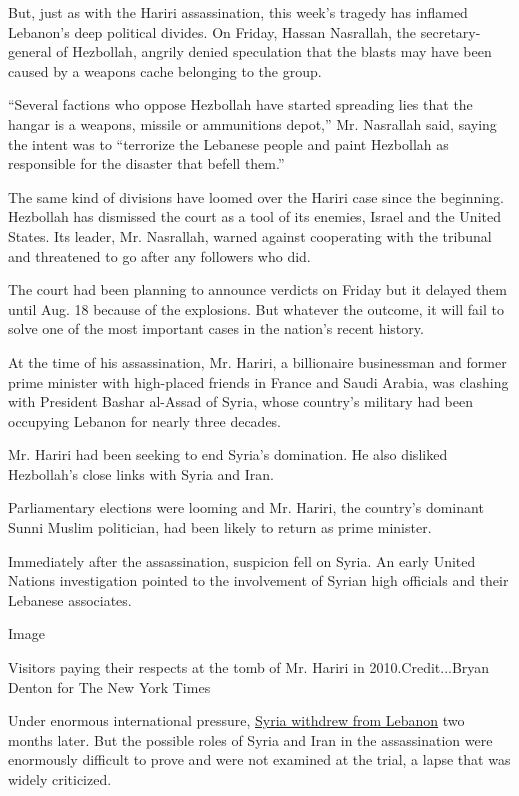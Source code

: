 But, just as with the Hariri assassination, this week's tragedy has
inflamed Lebanon's deep political divides. On Friday, Hassan Nasrallah,
the secretary-general of Hezbollah, angrily denied speculation that the
blasts may have been caused by a weapons cache belonging to the group.

``Several factions who oppose Hezbollah have started spreading lies that
the hangar is a weapons, missile or ammunitions depot,'' Mr. Nasrallah
said, saying the intent was to ``terrorize the Lebanese people and paint
Hezbollah as responsible for the disaster that befell them.''

The same kind of divisions have loomed over the Hariri case since the
beginning. Hezbollah has dismissed the court as a tool of its enemies,
Israel and the United States. Its leader, Mr. Nasrallah, warned against
cooperating with the tribunal and threatened to go after any followers
who did.

The court had been planning to announce verdicts on Friday but it
delayed them until Aug. 18 because of the explosions. But whatever the
outcome, it will fail to solve one of the most important cases in the
nation's recent history.

At the time of his assassination, Mr. Hariri, a billionaire businessman
and former prime minister with high-placed friends in France and Saudi
Arabia, was clashing with President Bashar al-Assad of Syria, whose
country's military had been occupying Lebanon for nearly three decades.

Mr. Hariri had been seeking to end Syria's domination. He also disliked
Hezbollah's close links with Syria and Iran.

Parliamentary elections were looming and Mr. Hariri, the country's
dominant Sunni Muslim politician, had been likely to return as prime
minister.

Immediately after the assassination, suspicion fell on Syria. An early
United Nations investigation pointed to the involvement of Syrian high
officials and their Lebanese associates.

Image

Visitors paying their respects at the tomb of Mr. Hariri in
2010.Credit...Bryan Denton for The New York Times

Under enormous international pressure,
\href{https://www.nytimes.com/2005/04/25/world/africa/syria-troops-end-29-years-of-presence-in-lebanon.html?searchResultPosition=8}{Syria
withdrew from Lebanon} two months later. But the possible roles of Syria
and Iran in the assassination were enormously difficult to prove and
were not examined at the trial, a lapse that was widely criticized.

